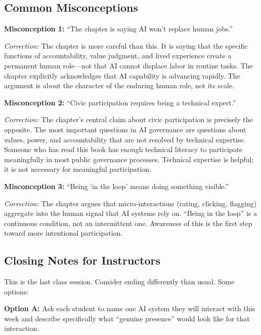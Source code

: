 \subsection*{Common Misconceptions}

\textbf{Misconception 1:} ``The chapter is saying AI won't replace human jobs.''

\textit{Correction:} The chapter is more careful than this. It is saying that the specific functions of accountability, value judgment, and lived experience create a permanent human role---not that AI cannot displace labor in routine tasks. The chapter explicitly acknowledges that AI capability is advancing rapidly. The argument is about the character of the enduring human role, not its scale.

\textbf{Misconception 2:} ``Civic participation requires being a technical expert.''

\textit{Correction:} The chapter's central claim about civic participation is precisely the opposite. The most important questions in AI governance are questions about values, power, and accountability that are not resolved by technical expertise. Someone who has read this book has enough technical literacy to participate meaningfully in most public governance processes. Technical expertise is helpful; it is not necessary for meaningful participation.

\textbf{Misconception 3:} ``Being `in the loop' means doing something visible.''

\textit{Correction:} The chapter argues that micro-interactions (rating, clicking, flagging) aggregate into the human signal that AI systems rely on. ``Being in the loop'' is a continuous condition, not an intermittent one. Awareness of this is the first step toward more intentional participation.

\subsection*{Closing Notes for Instructors}

This is the last class session. Consider ending differently than usual. Some options:

\textbf{Option A:} Ask each student to name one AI system they will interact with this week and describe specifically what ``genuine presence'' would look like for that interaction.

